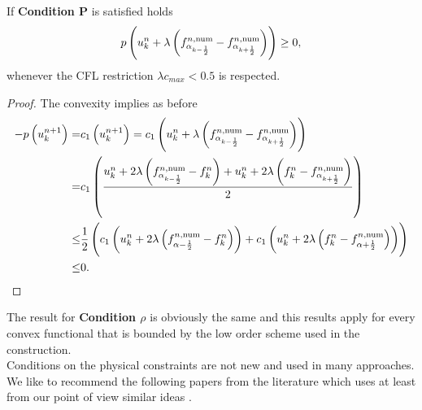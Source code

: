 \begin{lemma}
	If \textbf{Condition P}  is satisfied holds
	\[
		p\left (u^n_k + \lambda \left(f^{n, \mathrm{num}}_{\alpha_{k-\frac 1 2}} - f^{n, \mathrm{num}}_{\alpha_{k+\frac 1 2}} \right) \right) \geq 0,
	\]
	whenever the CFL restriction $\lambda c_{max} < 0.5$ is respected.
	\begin{proof}
		The convexity implies as before
		\[
		\begin{aligned}
			-p\left (u^{n+1}_k \right) = &c_1\left (u^{n+1}_k \right) = c_1\left (u^n_k + \lambda\left(f^{n, \mathrm{num}}_{\alpha_{k- \frac 1 2}} - f^{n, \mathrm{num}}_{\alpha_{k+\frac 1 2}}\right) \right) \\
			= &c_1\left (\frac{u^n_k + 2 \lambda \left (f^{n, \mathrm{num}}_{\alpha_{k-\frac 1 2}} - f^n_k\right) + u^n_k + 2\lambda\left(f^n_k - f^{n, \mathrm{num}}_{\alpha_{k+\frac 1 2}}\right)  }{2} \right) \\
			\leq &\frac 1 2 \left (c_1 \left (u^n_k + 2 \lambda \left(f^{n, \mathrm{num}}_{\alpha - \frac 1 2} - f^n_k\right) \right) + c_1 \left (u^n_k  + 2\lambda\left(f^n_k - f^{n, \mathrm{num}}_{\alpha + \frac 1 2}\right) \right) \right) \\ 
			\leq& 0.
			\end{aligned}
		\]
		\end{proof}
	\end{lemma}
	The result for \textbf{Condition $\rho$} is obviously the same and this results apply for every convex functional that is bounded by the low order scheme used in the construction. \\
Conditions on the physical constraints are not new and used in many approaches. We like to recommend the following papers from the literature which uses at least from our point of view similar ideas \cite{rueda2022subcell, kuzmin2020monolithic, kuzmin2021Limiter}.
